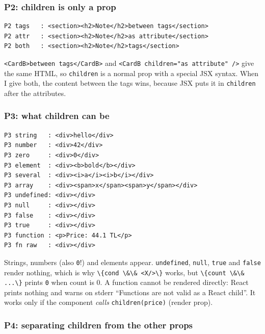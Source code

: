 \documentclass[
  11pt,
]{article}
\newcommand{\passthrough}[1]{#1}
\begin{document}
\subsubsection{P2: children is only a
prop}\label{p2-children-is-only-a-prop}

\begin{lstlisting}
P2 tags   : <section><h2>Note</h2>between tags</section>
P2 attr   : <section><h2>Note</h2>as attribute</section>
P2 both   : <section><h2>Note</h2>tags</section>
\end{lstlisting}

\passthrough{\lstinline!<CardB>between tags</CardB>!} and
\passthrough{\lstinline!<CardB children="as attribute" />!} give the
same HTML, so \passthrough{\lstinline!children!} is a normal prop with a
special JSX syntax. When I give both, the content between the tags wins,
because JSX puts it in \passthrough{\lstinline!children!} after the
attributes.

\subsubsection{P3: what children can be}\label{p3-what-children-can-be}

\begin{lstlisting}
P3 string   : <div>hello</div>
P3 number   : <div>42</div>
P3 zero     : <div>0</div>
P3 element  : <div><b>bold</b></div>
P3 several  : <div><i>a</i><i>b</i></div>
P3 array    : <div><span>x</span><span>y</span></div>
P3 undefined: <div></div>
P3 null     : <div></div>
P3 false    : <div></div>
P3 true     : <div></div>
P3 function : <p>Price: 44.1 TL</p>
P3 fn raw   : <div></div>
\end{lstlisting}

Strings, numbers (also \passthrough{\lstinline!0!}!) and elements
appear. \passthrough{\lstinline!undefined!},
\passthrough{\lstinline!null!}, \passthrough{\lstinline!true!} and
\passthrough{\lstinline!false!} render nothing, which is why
\passthrough{\lstinline!\{cond \&\& <X/>\}!} works, but
\passthrough{\lstinline!\{count \&\& ...\}!} prints
\passthrough{\lstinline!0!} when count is 0. A function cannot be
rendered directly: React prints nothing and warns on stderr ``Functions
are not valid as a React child''. It works only if the component
\emph{calls} \passthrough{\lstinline!children(price)!} (render prop).

\subsubsection{P4: separating children from the other
props}\label{p4-separating-children-from-the-other-props}
\end{document}
